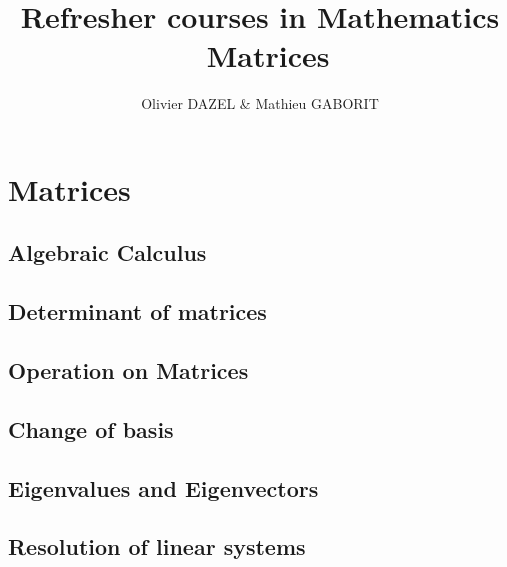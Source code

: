 \documentclass[10pt,a4paper]{report}
\title{\Large \textbf{Refresher courses in Mathematics}\\\
Matrices
}
\author{Olivier DAZEL \& Mathieu GABORIT}
\begin{document}
\maketitle




\chapter{Matrices}


\section{Algebraic Calculus}





%


\section{Determinant of matrices}








%


\section{Operation on Matrices}


\section{Change of basis}





\section{Eigenvalues and Eigenvectors}

%




\section{Resolution of linear systems}

\end{document}
